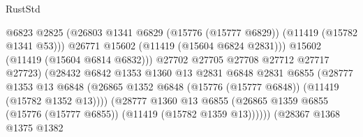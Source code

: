 \begin{lexlean}{RustStd}
\begin{coremodule}
                                              @6823
                                              @2825
                                              (@26803
                                                @1341
                                                @6829
                                                (@15776 (@15777 @6829))
                                                (@11419 (@15782 @1341 @53)))
                                              @26771
                                              @15602
                                              (@11419 (@15604 @6824 @2831)))
                                            @15602
                                            (@11419 (@15604 @6814 @6832)))
                                          @27702
                                          @27705
                                          @27708
                                          @27712
                                          @27717
                                          @27723)
                                        (@28432
                                          @6842
                                          @1353
                                          @1360
                                          @13
                                          @2831
                                          @6848
                                          @2831
                                          @6855
                                          (@28777
                                            @1353
                                            @13
                                            @6848
                                            (@26865
                                              @1352
                                              @6848
                                              (@15776 (@15777 @6848))
                                              (@11419 (@15782 @1352 @13))))
                                          (@28777
                                            @1360
                                            @13
                                            @6855
                                            (@26865
                                              @1359
                                              @6855
                                              (@15776 (@15777 @6855))
                                              (@11419 (@15782 @1359 @13))))))
                                      (@28367
                                        @1368
                                        @1375
                                        @1382

\end{coremodule}
\end{lexlean}
